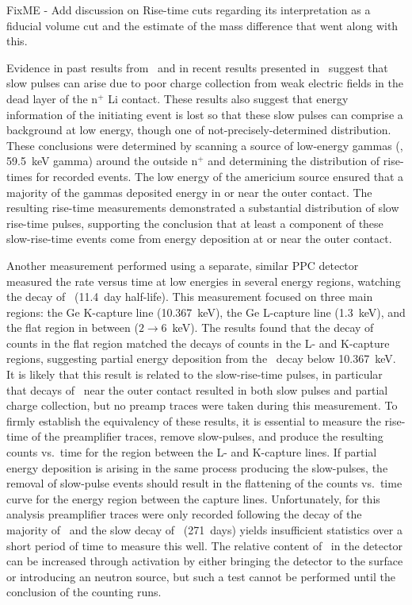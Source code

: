 FixME - Add discussion on Rise-time cuts regarding its interpretation as a fiducial volume cut and the estimate of the mass difference that went along with this.

Evidence in past results from~\cite{Strauss196780,Sakai:1971ff} and in recent results presented in~\cite{Aalseth:2010aa} suggest that slow pulses can arise due to poor charge collection from weak electric fields in the dead layer of the n$^{+}$ Li contact.  These results also suggest that energy information of the initiating event is lost so that these slow pulses can comprise a background at low energy, though one of not-precisely-determined distribution.	 These conclusions were determined by scanning a source of low-energy gammas (\amtwofourone, 59.5~keV gamma) around the outside n$^{+}$ and determining the distribution of rise-times for recorded events.  The low energy of the americium source ensured that a majority of the gammas deposited energy in or near the outer contact.  The resulting rise-time measurements demonstrated a substantial distribution of slow rise-time pulses, supporting the conclusion that at least a component of these slow-rise-time events come from energy deposition at or near the outer contact.  

Another measurement performed using a separate, similar PPC detector~\cite{BarbThesis} measured the rate versus time at low energies in several energy regions, watching the decay of \gersevenone~(11.4~day half-life).  This measurement focused on three main regions: the Ge K-capture line (10.367~keV), the Ge L-capture line (1.3~keV), and the flat region in between ($2\to6$~keV).  The results found that the decay of counts in the flat region matched the decays of counts in the L- and K-capture regions, suggesting partial energy deposition from the \gersevenone~decay below 10.367~keV.  It is likely that this result is related to the slow-rise-time pulses, in particular that decays of \gersevenone~near the outer contact resulted in both slow pulses and partial charge collection, but no preamp traces were taken during this measurement.  To firmly establish the equivalency of these results, it is essential to measure the rise-time of the preamplifier traces, remove slow-pulses, and produce the resulting counts vs.~time for the region between the L- and K-capture lines.  If partial energy deposition is arising in the same process producing the slow-pulses, the removal of slow-pulse events should result in the flattening of the counts vs.~time curve for the energy region between the capture lines.  Unfortunately, for this analysis preamplifier traces were only recorded following the decay of the majority of \gersevenone~and the slow decay of \gersixeight~(271~days) yields insufficient statistics over a short period of time to measure this well.  The relative content of \gersevenone~in the detector can be increased through activation by either bringing the detector to the surface or introducing an neutron source, but such a test cannot be performed until the conclusion of the counting runs.  

